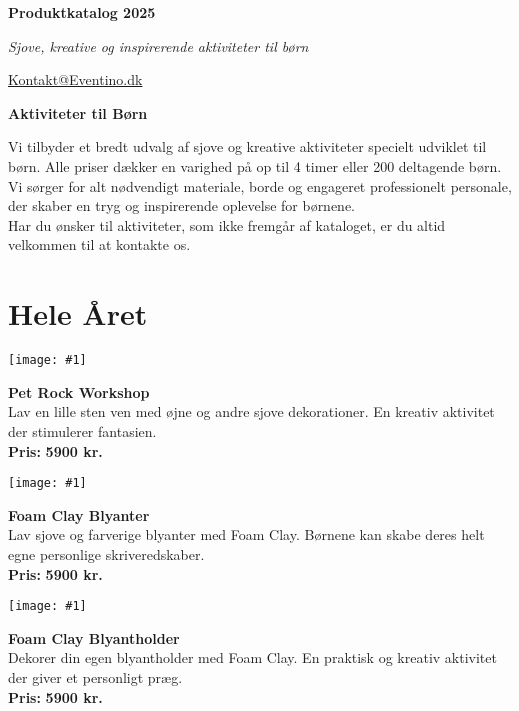 \documentclass[a4paper,12pt]{article}
\newcommand{\aktivitet}[5]{%
\vspace{1.5em}
\begin{tcolorbox}[colback=baggrund, colframe=#5!80!black, boxrule=0.5mm, arc=8mm, enhanced, drop shadow={black!50!gray}]
\begin{minipage}[c]{0.35\textwidth}
    \texttt{[image: \#1]}
\end{minipage}%
\hfill%
\begin{minipage}[c]{0.6\textwidth}
    {\Large \textsf{\textcolor{titel}{\textbf{#2}}}}\\[0.5em]
    {\normalsize #3}\\[1em]
    {\textbf{\textsf{\textcolor{subtitel}{Pris:}}} \textsf{\textbf{#4}}}
\end{minipage}%
\end{tcolorbox}
}
\begin{document}
\begin{titlepage}
    \centering
    \begin{tcolorbox}[colback=titel!10, colframe=titel, boxrule=1mm, arc=10mm, width=\textwidth, center title]
    {\shadowoffset{3pt}\Huge\textsf{\textbf{Produktkatalog 2025}}}
    \end{tcolorbox}
    
    \vspace{1.5cm}
    
    {\LARGE\textit{\textsf{\textcolor{subtitel}{Sjove, kreative og inspirerende aktiviteter til børn}}}}
    
    \vfill
    
    {\large \href{mailto:kontakt@eventino.dk}{Kontakt@Eventino.dk}}
\end{titlepage}

\begin{center}
    {\Huge \textsf{\textcolor{titel}{\textbf{Aktiviteter til Børn}}}}\\[1em]
    \begin{minipage}{0.85\textwidth}
        {\large Vi tilbyder et bredt udvalg af sjove og kreative aktiviteter specielt udviklet til børn. Alle priser dækker en varighed på op til 4 timer eller 200 deltagende børn. Vi sørger for alt nødvendigt materiale, borde og engageret professionelt personale, der skaber en tryg og inspirerende oplevelse for børnene.\\[1em]
        Har du ønsker til aktiviteter, som ikke fremgår af kataloget, er du altid velkommen til at kontakte os.}
    \end{minipage}
\end{center}

\vspace{2em}

\section*{Hele Året}
\aktivitet{Pet_Rock.jpg}{Pet Rock Workshop}{Lav en lille sten ven med øjne og andre sjove dekorationer. En kreativ aktivitet der stimulerer fantasien.}{5900 kr.}{heltaar}

\aktivitet{Blyanter.jpg}{Foam Clay Blyanter}{Lav sjove og farverige blyanter med Foam Clay. Børnene kan skabe deres helt egne personlige skriveredskaber.}{5900 kr.}{heltaar}

\aktivitet{Blyantholder.jpg}{Foam Clay Blyantholder}{Dekorer din egen blyantholder med Foam Clay. En praktisk og kreativ aktivitet der giver et personligt præg.}{5900 kr.}{heltaar}
\end{document}
